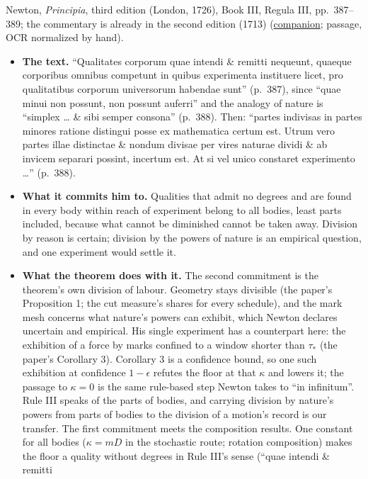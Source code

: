\documentclass[11pt,a4paper]{article}
\newcommand{\tightlist}{\setlength{\itemsep}{0pt}\setlength{\parskip}{0pt}}
\begin{document}
Newton, \emph{Principia}, third edition (London, 1726), Book III, Regula
III, pp.~387--389; the commentary is already in the second edition
(1713)
(\href{../docs/classics/Newton_Principia_1726_RegulaIII_la_OCR.md}{companion};
passage, OCR normalized by hand).

\begin{itemize}
\tightlist
\item
  \textbf{The text.} ``Qualitates corporum quae intendi \& remitti
  nequeunt, quaeque corporibus omnibus competunt in quibus experimenta
  instituere licet, pro qualitatibus corporum universorum habendae
  sunt'' (p.~387), since ``quae minui non possunt, non possunt auferri''
  and the analogy of nature is ``simplex \ldots{} \& sibi semper
  consona'' (p.~388). Then: ``partes indivisas in partes minores ratione
  distingui posse ex mathematica certum est. Utrum vero partes illae
  distinctae \& nondum divisae per vires naturae dividi \& ab invicem
  separari possint, incertum est. At si vel unico constaret experimento
  \ldots{}'' (p.~388).
\item
  \textbf{What it commits him to.} Qualities that admit no degrees and
  are found in every body within reach of experiment belong to all
  bodies, least parts included, because what cannot be diminished cannot
  be taken away. Division by reason is certain; division by the powers
  of nature is an empirical question, and one experiment would settle
  it.
\item
  \textbf{What the theorem does with it.} The second commitment is the
  theorem's own division of labour. Geometry stays divisible (the
  paper's Proposition 1; the cut measure's shares for every schedule),
  and the mark mesh concerns what nature's powers can exhibit, which
  Newton declares uncertain and empirical. His single experiment has a
  counterpart here: the exhibition of a force by marks confined to a
  window shorter than \(\tau_*\) (the paper's Corollary 3). Corollary 3
  is a confidence bound, so one such exhibition at confidence
  \(1-\epsilon\) refutes the floor at that \(\kappa\) and lowers it; the
  passage to \(\kappa=0\) is the same rule-based step Newton takes to
  ``in infinitum''. Rule III speaks of the parts of bodies, and carrying
  division by nature's powers from parts of bodies to the division of a
  motion's record is our transfer. The first commitment meets the
  composition results. One constant for all bodies (\(\kappa=mD\) in the
  stochastic route; rotation composition) makes the floor a quality
  without degrees in Rule III's sense (``quae intendi \& remitti

\end{itemize}
\end{document}
